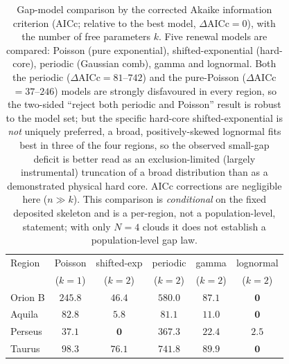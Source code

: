 \documentclass[usenatbib,twoside,twocolumn]{mnras}
\begin{document}
\begin{table}
\caption{Gap-model comparison by the corrected Akaike information criterion (AICc; relative to the best model, $\Delta$AICc$=0$), with the number of free parameters $k$. Five renewal models are compared: Poisson (pure exponential), shifted-exponential (hard-core), periodic (Gaussian comb), gamma and lognormal. Both the periodic ($\Delta$AICc$=81$--$742$) and the pure-Poisson ($\Delta$AICc$=37$--$246$) models are strongly disfavoured in every region, so the two-sided ``reject both periodic and Poisson'' result is robust to the model set; but the specific hard-core shifted-exponential is \emph{not} uniquely preferred, a broad, positively-skewed lognormal fits best in three of the four regions, so the observed small-gap deficit is better read as an exclusion-limited (largely instrumental) truncation of a broad distribution than as a demonstrated physical hard core. AICc corrections are negligible here ($n\gg k$). This comparison is \emph{conditional} on the fixed deposited skeleton and is a per-region, not a population-level, statement; with only $N=4$ clouds it does not establish a population-level gap law.}
\label{tab:aic}
\footnotesize
\setlength{\tabcolsep}{3pt}
\begin{tabular}{lccccc}
\toprule
Region & Poisson & shifted-exp & periodic & gamma & lognormal \\
       & ($k{=}1$) & ($k{=}2$) & ($k{=}2$) & ($k{=}2$) & ($k{=}2$) \\
\midrule
Orion B & $245.8$ & $46.4$ & $580.0$ & $87.1$ & $\mathbf{0}$ \\
Aquila  & $82.8$  & $5.8$  & $81.1$  & $11.0$ & $\mathbf{0}$ \\
Perseus & $37.1$  & $\mathbf{0}$ & $367.3$ & $22.4$ & $2.5$ \\
Taurus  & $98.3$  & $76.1$ & $741.8$ & $89.9$ & $\mathbf{0}$ \\
\bottomrule
\end{tabular}
\end{table}
\end{document}
